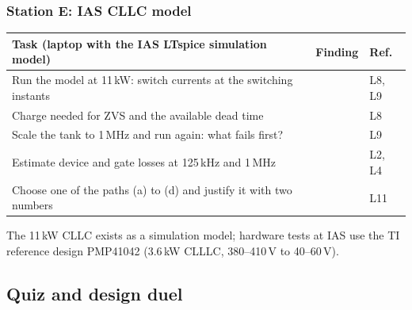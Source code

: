 \begin{frame}
	\frametitle{Station E: IAS CLLC model}
	\footnotesize
	\renewcommand{\arraystretch}{1.5}
	\begin{tabular}{|>{\raggedright\arraybackslash}p{6.2cm}|p{6.6cm}|l|}
		\hline
		\textbf{Task (laptop with the IAS LTspice simulation model)}                   & \textbf{Finding} & \textbf{Ref.} \\
		\hline
		Run the model at 11\,kW: switch currents at the switching instants             &                  & L8, L9        \\
		Charge needed for ZVS and the available dead time                              &                  & L8            \\
		Scale the tank to 1\,MHz and run again: what fails first?                      &                  & L9            \\
		Estimate device and gate losses at 125\,kHz and 1\,MHz                         &                  & L2, L4        \\
		Choose one of the paths (a) to (d) and justify it with two numbers             &                  & L11           \\
		\hline
	\end{tabular}
	\vspace{0.2cm}

	The 11\,kW CLLC exists as a simulation model; hardware tests at IAS use the TI reference design PMP41042 (3.6\,kW CLLLC, 380--410\,V to 40--60\,V).
\end{frame}

\subsection{Quiz and design duel}

